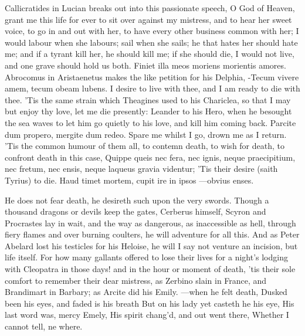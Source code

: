 {Callicratides in Lucian breaks out into this passionate speech, O
God of Heaven, grant me this life for ever to sit over against my
mistress, and to hear her sweet voice, to go in and out with her, to
have every other business common with her; I would labour when she
labours; sail when she sails; he that hates her should hate me; and if
a tyrant kill her, he should kill me; if she should die, I would not
live, and one grave should hold us both. Finiet illa meos moriens
morientis amores. Abrocomus in Aristaenetus makes the like
petition for his Delphia, -Tecum vivere amem, tecum obeam lubens.
I desire to live with thee, and I am ready to die with thee. 'Tis the
same strain which Theagines used to his Chariclea, so that I may but
enjoy thy love, let me die presently: Leander to his Hero, when he
besought the sea waves to let him go quietly to his love, and kill him
coming back. Parcite dum propero, mergite dum redeo. Spare me
whilst I go, drown me as I return. 'Tis the common humour of them all,
to contemn death, to wish for death, to confront death in this case,
Quippe queis nec fera, nec ignis, neque praecipitium, nec fretum, nec
ensis, neque laqueus gravia videntur; 'Tis their desire (saith Tyrius)
to die.
Haud timet mortem, cupit ire in ipsos
---obvius enses.

He does not fear death, he desireth such upon the very swords. Though a
thousand dragons or devils keep the gates, Cerberus himself, Scyron and
Procrastes lay in wait, and the way as dangerous, as inaccessible as
hell, through fiery flames and over burning coulters, he will adventure
for all this. And as Peter Abelard lost his testicles for his
Heloise, he will I say not venture an incision, but life itself. For
how many gallants offered to lose their lives for a night's lodging
with Cleopatra in those days! and in the hour or moment of death, 'tis
their sole comfort to remember their dear mistress, as Zerbino
slain in France, and Brandimart in Barbary; as Arcite did his Emily.
---when he felt death,
Dusked been his eyes, and faded is his breath
But on his lady yet casteth he his eye,
His last word was, mercy Emely,
His spirit chang'd, and out went there,
Whether I cannot tell, ne where.

}
